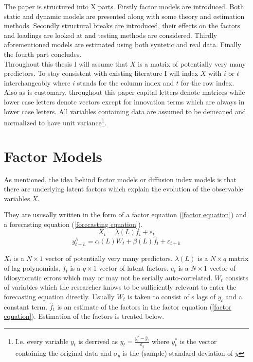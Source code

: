 \documentclass[12pt]{article}
\begin{document}
The paper is structured into X parts. Firstly factor models are introduced. Both static and dynamic models are presented along with some theory and estimation methods. Secondly structural breaks are introduced, their effects on the factors and loadings are looked at and testing methods are considered. Thirdly aforementioned models are estimated using both syntetic and real data. Finally the fourth part concludes. \\

Throughout this thesis I will assume that $X$ is a matrix of potentially very many predictors. To stay consistent with existing literature I will index $X$ with $i$ or $t$ interchangeably where $i$ stands for the column index and $t$ for the row index. Also as is customary, throughout this paper capital letters denote matrices while lower case letters denote vectors except for innovation terms which are always in lower case letters. All variables containing data are assumed to be demeaned and normalized to have unit variance\footnote{I.e. every variable $y_t$ is derrived as $y_t = \frac{y_t^* - \bar y_t}{\sigma_{y}}$ where $y_t^*$ is the vector containing the original data and $\sigma_{y}$ is the (sample) standard deviation of $y$}.

\section{Factor Models}
As mentioned, the idea behind factor models or diffusion index models is that there are underlying latent factors which explain the evolution of the observable variables $X$. 

They are ususally written in the form of a factor equation (\ref{factor equation}) and a forecasting equation (\ref{forecasting equation}). 
\begin{equation}
	\label{factor equation}
	X_t = \lambda(L) f_t + e_t
\end{equation}
\begin{equation}
	\label{forecasting equation}
	y^h_{t+h} = \alpha(L) W_t + \beta(L) \hat f_t + \varepsilon_{t+h}
\end{equation}
	
$X_t$ is a $N \times 1$ vector of potentially very many predictors. $\lambda(L)$ is a $N \times q$ matrix of lag polynomials, $f_t$ is a $q \times 1$ vector of latent factors. $e_t$ is a $N \times 1$ vector of idiosyncratic errors which may or may not be serially auto-correlated. $W_t$ consists of variables which the researcher knows to be sufficiently relevant to enter the forecasting equation directly. Usually $W_t$ is taken to consist of s lags of $y_t$ and a constant term. $\hat f_t$ is an estimate of the factors in the factor equation (\ref{factor equation}). Estimation of the factors is treated below.
\end{document}
